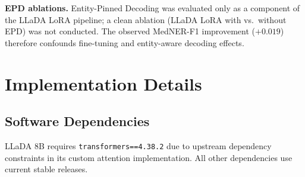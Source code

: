\documentclass[11pt]{article}
\begin{document}
\textbf{EPD ablations.} Entity-Pinned Decoding was evaluated only as a
component of the LLaDA LoRA pipeline; a clean ablation (LLaDA LoRA with
vs.\ without EPD) was not conducted. The observed MedNER-F1 improvement
($+0.019$) therefore confounds fine-tuning and entity-aware decoding
effects.

%


\appendix

\section{Implementation Details}
\label{sec:appendix}

\subsection*{Software Dependencies}
LLaDA 8B requires \texttt{transformers==4.38.2} due to upstream
dependency constraints in its custom attention implementation.
All other dependencies use current stable releases.
\end{document}
